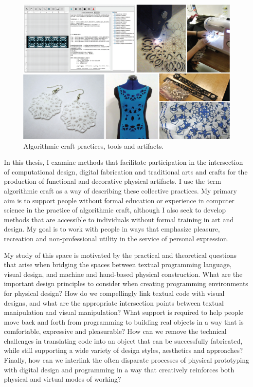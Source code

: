  \begin{center}
 \begin{figure}[h!]
\includegraphics[width=\columnwidth]{images/intro_pic.jpg}
\caption{Algorithmic craft practices, tools and artifacts. }
\label{fig:intro}
\end{figure}
\end{center}

In this thesis, I examine methods that facilitate participation in the intersection of computational design, digital fabrication and traditional arts and crafts for the production of functional and decorative physical artifacts. I use the term algorithmic craft as a way of describing these collective practices. My primary aim is to support people without formal education or experience in computer science in the practice of algorithmic craft, although I also seek to develop methods that are accessible to individuals without formal training in art and design. My goal is to work with people in ways that emphasize pleasure, recreation and non-professional utility in the service of personal expression. 

My study of this space is motivated by the practical and theoretical questions that arise when bridging the spaces between textual programming language, visual design, and machine and hand-based physical construction. What are the important design principles to consider when creating  programming environments for physical design? How do we compellingly link textual code with visual designs, and what are the appropriate intersection points between textual manipulation and visual manipulation? What support is required to help people move back and forth from programming to building real objects in a way that is comfortable, expressive and pleasurable? How can we remove the technical challenges in translating code into an object that can be successfully fabricated, while still supporting a wide variety of design styles, aesthetics and approaches? Finally, how can we interlink the often disparate processes of physical prototyping with digital design and programming in a way that creatively reinforces both physical and virtual modes of working?

